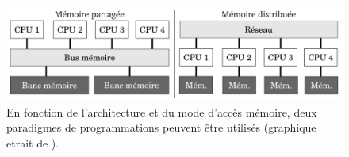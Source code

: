             
                        
            \begin{figure}
                \center
                \includegraphics[width=12cm]{images/edl_ditribue_partage.png}
                \caption{\label{fig:edl_ditribue_partage} En fonction de l'architecture et du mode d'accès mémoire, deux paradigmes de programmations peuvent être utilisés (graphique etrait de \cite{Valat2016}).}
            \end{figure}
                        
            
            
